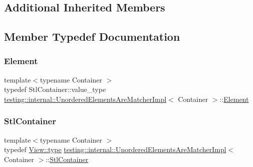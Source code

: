 \subsection*{Additional Inherited Members}


\subsection{Member Typedef Documentation}
\mbox{\label{classtesting_1_1internal_1_1_unordered_elements_are_matcher_impl_ad62ba6ff582afe086d522951f94e30d0}} 
\subsubsection{\texorpdfstring{Element}{Element}}
{\footnotesize\ttfamily template$<$typename Container $>$ \\
typedef Stl\+Container\+::value\+\_\+type \hyperlink{classtesting_1_1internal_1_1_unordered_elements_are_matcher_impl}{testing\+::internal\+::\+Unordered\+Elements\+Are\+Matcher\+Impl}$<$ Container $>$\+::\hyperlink{classtesting_1_1internal_1_1_unordered_elements_are_matcher_impl_ad62ba6ff582afe086d522951f94e30d0}{Element}}

\mbox{\label{classtesting_1_1internal_1_1_unordered_elements_are_matcher_impl_a6c23354dfe53bb47fa3d38d2869e273c}} 
\subsubsection{\texorpdfstring{Stl\+Container}{StlContainer}}
{\footnotesize\ttfamily template$<$typename Container $>$ \\
typedef \hyperlink{classtesting_1_1internal_1_1_stl_container_view_a2b2c63a6dcdbfe63fb0ee121ebf463ba}{View\+::type} \hyperlink{classtesting_1_1internal_1_1_unordered_elements_are_matcher_impl}{testing\+::internal\+::\+Unordered\+Elements\+Are\+Matcher\+Impl}$<$ Container $>$\+::\hyperlink{classtesting_1_1internal_1_1_unordered_elements_are_matcher_impl_a6c23354dfe53bb47fa3d38d2869e273c}{Stl\+Container}}

